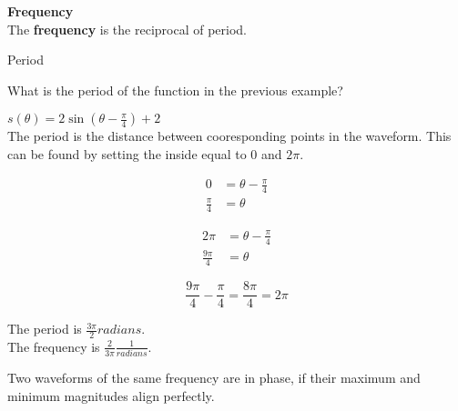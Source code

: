 \documentclass{ximera}
\begin{document}
\begin{definition} \textbf{\textcolor{green!50!black}{Frequency}} \\

The \textbf{frequency} is the reciprocal of period.

\end{definition}














\begin{example}  Period

What is the period of the function in the previous example?



\begin{explanation}

$s(\theta) = 2 \sin\left(\theta - \frac{\pi}{4}\right) + 2$ \\


The period is the distance between cooresponding points in the waveform.  This can be found by setting the inside equal to $0$ and $2\pi$.

\begin{align*}
 0 & = \theta - \frac{\pi}{4} \\
 \frac{\pi}{4} & = \theta 
 \end{align*}

\begin{align*}
 2 \pi & = \theta - \frac{\pi}{4} \\
 \frac{9\pi}{4} & = \theta 
 \end{align*}

\[
\frac{9\pi}{4} - \frac{\pi}{4} = \frac{8\pi}{4} = 2 \pi
\]


\end{explanation}

The period is $\frac{3\pi}{2} radians$. \\

The frequency is $\frac{2}{3\pi} \tfrac{1}{radians}$. \\

\end{example}






Two waveforms of the same frequency are in phase, if their maximum and minimum magnitudes align perfectly.
\end{document}
